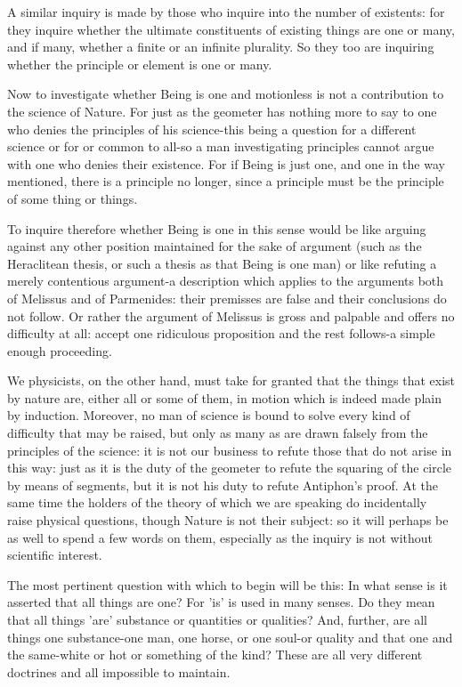 A similar inquiry is made by those who inquire into the number of
existents: for they inquire whether the ultimate constituents of existing
things are one or many, and if many, whether a finite or an infinite
plurality. So they too are inquiring whether the principle or element
is one or many. 

Now to investigate whether Being is one and motionless is not a contribution
to the science of Nature. For just as the geometer has nothing more
to say to one who denies the principles of his science-this being
a question for a different science or for or common to all-so a man
investigating principles cannot argue with one who denies their existence.
For if Being is just one, and one in the way mentioned, there is a
principle no longer, since a principle must be the principle of some
thing or things. 

To inquire therefore whether Being is one in this sense would be like
arguing against any other position maintained for the sake of argument
(such as the Heraclitean thesis, or such a thesis as that Being is
one man) or like refuting a merely contentious argument-a description
which applies to the arguments both of Melissus and of Parmenides:
their premisses are false and their conclusions do not follow. Or
rather the argument of Melissus is gross and palpable and offers no
difficulty at all: accept one ridiculous proposition and the rest
follows-a simple enough proceeding. 

We physicists, on the other hand, must take for granted that the things
that exist by nature are, either all or some of them, in motion which
is indeed made plain by induction. Moreover, no man of science is
bound to solve every kind of difficulty that may be raised, but only
as many as are drawn falsely from the principles of the science: it
is not our business to refute those that do not arise in this way:
just as it is the duty of the geometer to refute the squaring of the
circle by means of segments, but it is not his duty to refute Antiphon's
proof. At the same time the holders of the theory of which we are
speaking do incidentally raise physical questions, though Nature is
not their subject: so it will perhaps be as well to spend a few words
on them, especially as the inquiry is not without scientific interest.

The most pertinent question with which to begin will be this: In what
sense is it asserted that all things are one? For 'is' is used in
many senses. Do they mean that all things 'are' substance or quantities
or qualities? And, further, are all things one substance-one man,
one horse, or one soul-or quality and that one and the same-white
or hot or something of the kind? These are all very different doctrines
and all impossible to maintain. 

